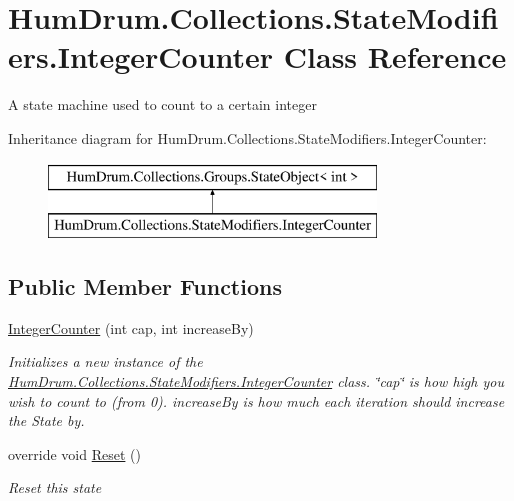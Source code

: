 \hypertarget{classHumDrum_1_1Collections_1_1StateModifiers_1_1IntegerCounter}{}\section{Hum\+Drum.\+Collections.\+State\+Modifiers.\+Integer\+Counter Class Reference}
\label{classHumDrum_1_1Collections_1_1StateModifiers_1_1IntegerCounter}


A state machine used to count to a certain integer  


Inheritance diagram for Hum\+Drum.\+Collections.\+State\+Modifiers.\+Integer\+Counter\+:\begin{figure}[H]
\begin{center}
\leavevmode
\includegraphics[height=2.000000cm]{classHumDrum_1_1Collections_1_1StateModifiers_1_1IntegerCounter}
\end{center}
\end{figure}
\subsection*{Public Member Functions}
\begin{DoxyCompactItemize}
\item 
\hyperlink{classHumDrum_1_1Collections_1_1StateModifiers_1_1IntegerCounter_aaea0c5cd68fb791212431fe814da3b78}{Integer\+Counter} (int cap, int increase\+By)
\begin{DoxyCompactList}\small\item\em Initializes a new instance of the \hyperlink{classHumDrum_1_1Collections_1_1StateModifiers_1_1IntegerCounter}{Hum\+Drum.\+Collections.\+State\+Modifiers.\+Integer\+Counter} class. \char`\"{}cap\char`\"{} is how high you wish to count to (from 0). increase\+By is how much each iteration should increase the State by. \end{DoxyCompactList}\item 
override void \hyperlink{classHumDrum_1_1Collections_1_1StateModifiers_1_1IntegerCounter_a8723ab8842f09ee98d9e13b7714d14a7}{Reset} ()
\begin{DoxyCompactList}\small\item\em Reset this state \end{DoxyCompactList}\end{DoxyCompactItemize}
